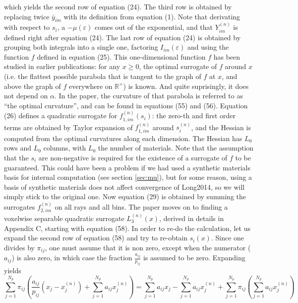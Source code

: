 \documentclass[a4paper, 10pt]{article}
\begin{document}
which yields the second row of equation (24).
The third row is obtained by replacing twice $\bar{y}_{im}$ with its definition from equation (1). Note that derivating with respect to $s_i$, a $-\mu(\varepsilon)$
comes out of the exponential, and that $Y_{im}^{(n)}$ is defined right after equation (24).
The last row of equation (24) is obtained by grouping both integrals into a single one, factoring $I_{im}(\varepsilon)$ and using the function $f$ defined in equation (25).
This one-dimensional function $f$ has been studied in earlier publications: for any $x \geq 0$, the optimal surrogate of $f$ around $x$ (i.e. the flattest possible parabola
that is tangent to the graph of $f$ at $x$, and above the graph of $f$ everywhere on $\mathbb{R}^{+}$) is known. And quite suprisingly, it does not depend on $\alpha$. 
In the paper, the curvature of that parabola is referred to as ``the optimal curvature'',
and can be found in equations (55) and (56).
Equation (26) defines a quadratic surrogate for $f_{1, im}^{(n)}(s_i)$: the zero-th and first order terms are obtained by Taylor expansion of $f_{1, im}^{(n)}$ around $s_i^{(n)}$, 
and the Hessian is computed from the optimal curvatures along each dimension. The Hessian has $L_0$ rows and $L_0$ columns, with $L_0$ the number of materials. Note that
the assumption that the $s_i$ are non-negative is required for the existence of a surrogate of $f$ to be guaranteed. This could have been a problem 
if we had used a synthetic materials basis for internal computation (see section \ref{sec:mu}), but for some reason, using a basis of synthetic materials does not affect convergence 
of Long2014, so we will simply stick to the original one. 
Now equation (29) is obtained by summing the surrogates $f_{2, im}^{(n)}$ on all rays and all bins. 
The paper moves on to finding a voxelwise separable quadratic surrogate $L_3^{(n)}(x)$, derived in details in Appendix C, starting with equation (58). In order to re-do the 
calculation, let us expand the second row of equation (58) and try to re-obtain $s_i(x)$.
Since one divides by $\pi_{ij}$, one must assume that it is non zero, except when the numerator ($a_{ij}$) is also zero, in which case the fraction $\frac{a_{ij}}{p_{ij}} $ is assumed to 
be zero. Expanding yields
\begin{equation*}
 \sum_{j=1}^{N_p} \pi_{ij} \left( \frac{a_{ij}}{p_{ij}} (x_j - x_j^{(n)}) + \sum_{j=1}^{N_p} a_{ij} x_j^{(n)} \right) = \sum_{j=1}^{N_p} a_{ij} x_j - \sum_{j=1}^{N_p} a_{ij} x_j^{(n)} + \sum_{j=1}^{N_p} \pi_{ij} \left( \sum_{j=1}^{N_p} a_{ij} x_j^{(n)} \right)
\end{equation*}
\end{document}
